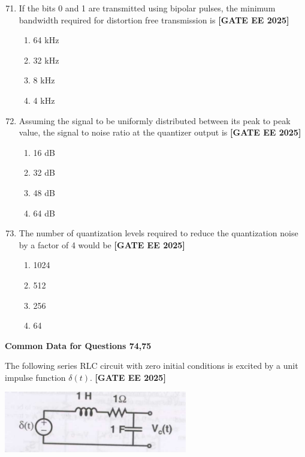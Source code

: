 \documentclass[12pt,a4paper]{article}
\begin{document}
\begin{enumerate}[leftmargin=*, label=\textbf{Q.\arabic*:}]
\setcounter{enumi}{70}

\item If the bits 0 and 1 are transmitted using bipolar pulses, the minimum bandwidth required for distortion free transmission is
\newline
\noindent \textbf{[GATE EE 2025]}
\begin{enumerate}[label=(\Alph*)]
  \item 64 kHz
  \item 32 kHz
  \item 8 kHz
  \item 4 kHz
\end{enumerate}

\item Assuming the signal to be uniformly distributed between its peak to peak value, the signal to noise ratio at the quantizer output is
\newline
\noindent \textbf{[GATE EE 2025]}
\begin{enumerate}[label=(\Alph*)]
  \item 16 dB
  \item 32 dB
  \item 48 dB
  \item 64 dB
\end{enumerate}

\item The number of quantization levels required to reduce the quantization noise by a factor of 4 would be
\newline
\noindent \textbf{[GATE EE 2025]}
\begin{enumerate}[label=(\Alph*)]
  \item 1024
  \item 512
  \item 256
  \item 64
\end{enumerate}

\end{enumerate}

\vspace{1em}
\item \textbf{Common Data for Questions 74,75}
\vspace{1em}

\item The following series RLC circuit with zero initial conditions is excited by a unit impulse function $\delta(t)$.
\newline
\noindent \textbf{[GATE EE 2025]}
\begin{center}
\includegraphics[width=0.6\textwidth]{figs/q7475.png}
\end{center}
\end{document}
